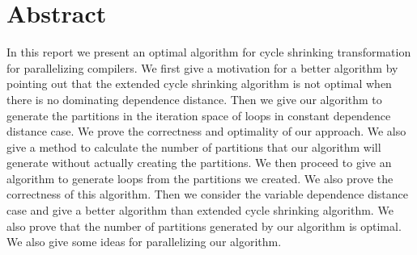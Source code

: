 \chapter*{Abstract}
In this report we present an optimal algorithm for cycle shrinking transformation for parallelizing compilers. We first give a motivation for a better algorithm by pointing out that the extended cycle shrinking algorithm is not optimal when there is no dominating dependence distance. Then we give our algorithm to generate the partitions in the iteration space of loops in constant dependence distance case. We prove the correctness and optimality of our approach. We also give a method to calculate the number of partitions that our algorithm will generate without actually creating the partitions. We then proceed to give an algorithm to generate loops from the partitions we created. We also prove the correctness of this algorithm. Then we consider the variable dependence distance case and give a better algorithm than extended cycle shrinking algorithm. We also prove that the number of partitions generated by our algorithm is optimal. We also give some ideas for parallelizing our algorithm.
